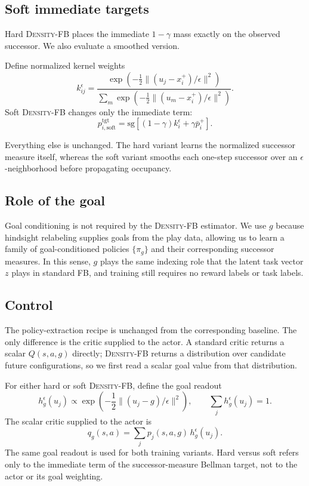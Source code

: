 \documentclass{article}
\newcommand{\sg}{\mathrm{sg}}
\newcommand{\DensityFB}{\textsc{Density-FB}}
\begin{document}
\subsection{Soft immediate targets}

Hard \DensityFB{} places the immediate $1-\gamma$ mass exactly on the observed successor.
We also evaluate a smoothed version.

Define normalized kernel weights
\begin{equation}
k_{ij}^{\epsilon} = \frac{ \exp\!\left( -\frac12 \|(u_j-x_i^+)/\epsilon\|^2 \right)}{ \sum_m \exp\!\left( -\frac12 \|(u_m-x_i^+)/\epsilon\|^2 \right)
}.
\end{equation}
Soft \DensityFB{} changes only the immediate term:
\begin{equation}
\label{eq:soft-target}
    p_{i,\mathrm{soft}}^{\mathrm{tgt}} = \sg\left[ (1-\gamma)k_i^\epsilon + \gamma\bar p_i^+\right].
\end{equation}

Everything else is unchanged.
The hard variant learns the normalized successor measure itself, whereas the soft variant smooths each one-step successor over an $\epsilon$-neighborhood before propagating occupancy.

\subsection{Role of the goal}

Goal conditioning is not required by the \DensityFB{} estimator.
We use $g$ because hindsight relabeling supplies goals from the play data, allowing us to learn a family of goal-conditioned policies $\{\pi_g\}$ and their corresponding successor measures.
In this sense, $g$ plays the same indexing role that the latent task vector $z$ plays in standard FB, and training still requires no reward labels or task labels.

\subsection{Control}

The policy-extraction recipe is unchanged from the corresponding baseline.
The only difference is the critic supplied to the actor.
A standard critic returns a scalar $Q(s,a,g)$ directly; \DensityFB{} returns a distribution over candidate future configurations, so we first read a scalar
goal value from that distribution.

For either hard or soft \DensityFB{}, define the goal readout
\begin{equation} 
    h_g^\epsilon(u_j) \propto \exp\!\left( -\frac12 \|(u_j-g)/\epsilon\|^2 \right), \qquad \sum_j h_g^\epsilon(u_j)=1.
\end{equation}
The scalar critic supplied to the actor is
\begin{equation}
\label{eq:goal-readout}
    q_g(s,a) = \sum_j p_j(s,a,g)\, h_g^\epsilon(u_j).
\end{equation}
The same goal readout is used for both training variants.
Hard versus soft refers only to the immediate term of the successor-measure
Bellman target, not to the actor or its goal weighting.
\end{document}

